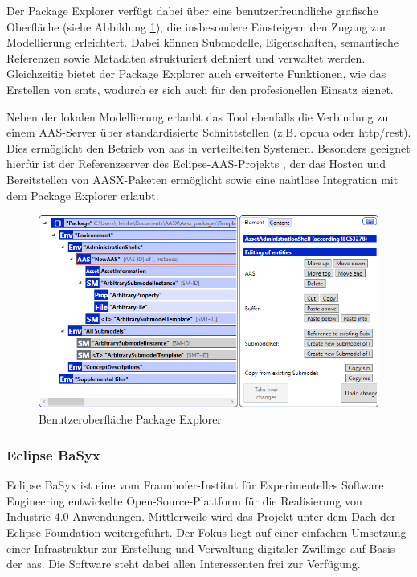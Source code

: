 Der Package Explorer verfügt dabei über eine benutzerfreundliche grafische Oberfläche (siehe Abbildung \ref{fig:AASXPackageExplorer}), die insbesondere Einsteigern den Zugang zur Modellierung erleichtert.
Dabei können Submodelle, Eigenschaften, semantische Referenzen sowie Metadaten strukturiert definiert und verwaltet werden.
Gleichzeitig bietet der Package Explorer auch erweiterte Funktionen, wie das Erstellen von \acsp{smt}, wodurch er sich auch für den profesionellen Einsatz eignet.

Neben der lokalen Modellierung erlaubt das Tool ebenfalls die Verbindung zu einem AAS-Server über standardisierte Schnittstellen (z.B. \acs{opcua} oder \acs{http}/\acs{rest}).
Dies ermöglicht den Betrieb von \acs{aas} in verteiltelten Systemen.
Besonders geeignet hierfür ist der Referenzserver des Eclipse-AAS-Projekts \cite{AASXServer}, der das Hosten und Bereitstellen von AASX-Paketen ermöglicht sowie eine nahtlose Integration mit dem Package Explorer erlaubt.

\newpage
\begin{figure}[htbp]
    \centering
    \includegraphics[scale=0.765]{Bilder/ModellierungAAS/Final/Grundlagen_PE.PNG}
    \caption{Benutzeroberfläche Package Explorer}
    \label{fig:AASXPackageExplorer}
\end{figure}

\subsubsection{Eclipse BaSyx }
Eclipse BaSyx ist eine vom Fraunhofer-Institut für Experimentelles Software Engineering entwickelte Open-Source-Plattform für die Realisierung von Industrie-4.0-Anwendungen.
Mittlerweile wird das Projekt unter dem Dach der Eclipse Foundation weitergeführt.
Der Fokus liegt auf einer einfachen Umsetzung einer Infrastruktur zur Erstellung und Verwaltung digitaler Zwillinge auf Basis der \acs{aas}.
Die Software steht dabei allen Interessenten frei zur Verfügung.


